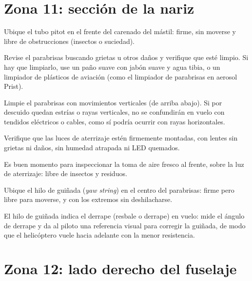 \section{Zona 11: sección de la nariz}

Ubique el tubo pitot en el frente del carenado del mástil: firme, sin moverse y libre de obstrucciones (insectos o suciedad).

Revise el parabrisas buscando grietas u otros daños y verifique que esté limpio. Si hay que limpiarlo, use un paño suave con jabón suave y agua tibia, o un limpiador de plásticos de aviación (como el limpiador de parabrisas en aerosol Prist).

\begin{nota}
Limpie el parabrisas con movimientos verticales (de arriba abajo). Si por descuido quedan estrías o rayas verticales, no se confundirán en vuelo con tendidos eléctricos o cables, como sí podría ocurrir con rayas horizontales.
\end{nota}

Verifique que las luces de aterrizaje estén firmemente montadas, con lentes sin grietas ni daños, sin humedad atrapada ni LED quemados.

\begin{nota}
Es buen momento para inspeccionar la toma de aire fresco al frente, sobre la luz de aterrizaje: libre de insectos y residuos.
\end{nota}

Ubique el hilo de guiñada (\emph{yaw string}) en el centro del parabrisas: firme pero libre para moverse, y con los extremos sin deshilacharse.

\begin{nota}
El hilo de guiñada indica el derrape (resbale o derrape) en vuelo: mide el ángulo de derrape y da al piloto una referencia visual para corregir la guiñada, de modo que el helicóptero vuele hacia adelante con la menor resistencia.
\end{nota}

\section{Zona 12: lado derecho del fuselaje}

